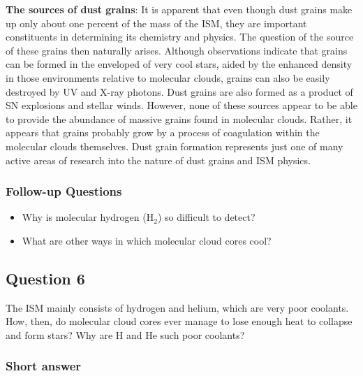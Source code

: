 \documentclass[a4paper,10pt]{article}
\begin{document}
{\noindent}\textbf{The sources of dust grains}: It is apparent that even though dust grains make up only about one percent of the mass of the ISM, they are important constituents in determining its chemistry and physics. The question of the source of these grains then naturally arises. Although observations indicate that grains can be formed in the enveloped of very cool stars, aided by the enhanced density in those environments relative to molecular clouds, grains can also be easily destroyed by UV and X-ray photons. Dust grains are also formed as a product of SN explosions and stellar winds. However, none of these sources appear to be able to provide the abundance of massive grains found in molecular clouds. Rather, it appears that grains probably grow by a process of coagulation within the molecular clouds themselves. Dust grain formation represents just one of many active areas of research into the nature of dust grains and ISM physics.

\subsubsection{Follow-up Questions}

\begin{itemize}
    \item Why is molecular hydrogen (H$_2$) so difficult to detect?
    \item What are other ways in which molecular cloud cores cool?
\end{itemize}


\newpage
\subsection{Question 6}

The ISM mainly consists of hydrogen and helium, which are very poor coolants. How, then, do molecular cloud cores ever manage to lose enough heat to collapse and form stars? Why are H and He such poor coolants?

\subsubsection{Short answer}
\end{document}
